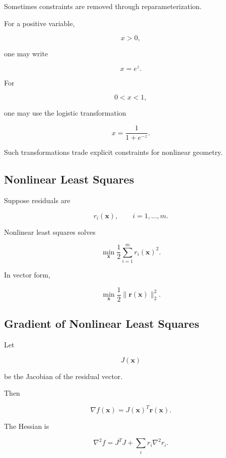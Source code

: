 Sometimes constraints are removed through reparameterization.

For a positive variable,

\[
x>0,
\]

one may write

\[
\boxed{
x=e^z.
}
\]

For

\[
0<x<1,
\]

one may use the logistic transformation

\[
\boxed{
x
=
\frac{
1
}{
1+e^{-z}
}.
}
\]

Such transformations trade explicit constraints for nonlinear geometry.

\subsection{Nonlinear Least Squares}
\label{subsec:nonlinear-least-squares}

Suppose residuals are

\[
r_i(\mathbf{x}),
\qquad
i=1,\ldots,m.
\]

Nonlinear least squares solves

\[
\boxed{
\min_{\mathbf{x}}
\frac12
\sum_{i=1}^{m}
r_i(\mathbf{x})^2.
}
\]

In vector form,

\[
\boxed{
\min_{\mathbf{x}}
\frac12
\|
\mathbf{r}(\mathbf{x})
\|_2^2.
}
\]

\subsection{Gradient of Nonlinear Least Squares}
\label{subsec:nonlinear-least-squares-gradient}

Let

\[
J(\mathbf{x})
\]

be the Jacobian of the residual vector.

Then

\[
\boxed{
\nabla f(\mathbf{x})
=
J(\mathbf{x})^T
\mathbf{r}(\mathbf{x}).
}
\]

The Hessian is

\[
\boxed{
\nabla^2f
=
J^TJ
+
\sum_i
r_i
\nabla^2r_i.
}
\]

